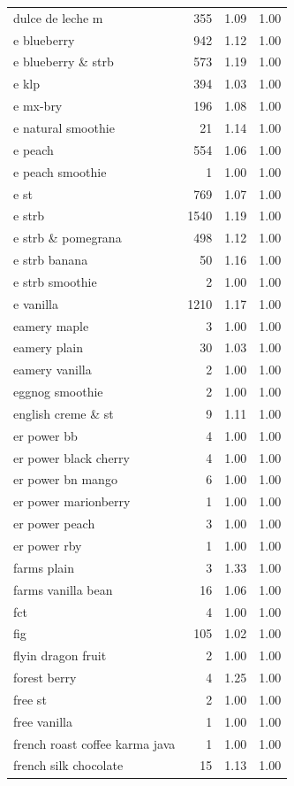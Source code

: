 \begin{table}
\begin{tabular}{lrrr}
dulce de leche m & 355 & 1.09 & 1.00 \\
e blueberry & 942 & 1.12 & 1.00 \\
e blueberry \& strb & 573 & 1.19 & 1.00 \\
e klp & 394 & 1.03 & 1.00 \\
e mx-bry & 196 & 1.08 & 1.00 \\
e natural smoothie & 21 & 1.14 & 1.00 \\
e peach & 554 & 1.06 & 1.00 \\
e peach smoothie & 1 & 1.00 & 1.00 \\
e st & 769 & 1.07 & 1.00 \\
e strb & 1540 & 1.19 & 1.00 \\
e strb \& pomegrana & 498 & 1.12 & 1.00 \\
e strb banana & 50 & 1.16 & 1.00 \\
e strb smoothie & 2 & 1.00 & 1.00 \\
e vanilla & 1210 & 1.17 & 1.00 \\
eamery maple & 3 & 1.00 & 1.00 \\
eamery plain & 30 & 1.03 & 1.00 \\
eamery vanilla & 2 & 1.00 & 1.00 \\
eggnog smoothie & 2 & 1.00 & 1.00 \\
english creme \& st & 9 & 1.11 & 1.00 \\
er power bb & 4 & 1.00 & 1.00 \\
er power black cherry & 4 & 1.00 & 1.00 \\
er power bn mango & 6 & 1.00 & 1.00 \\
er power marionberry & 1 & 1.00 & 1.00 \\
er power peach & 3 & 1.00 & 1.00 \\
er power rby & 1 & 1.00 & 1.00 \\
farms plain & 3 & 1.33 & 1.00 \\
farms vanilla bean & 16 & 1.06 & 1.00 \\
fct & 4 & 1.00 & 1.00 \\
fig & 105 & 1.02 & 1.00 \\
flyin dragon fruit & 2 & 1.00 & 1.00 \\
forest berry & 4 & 1.25 & 1.00 \\
free st & 2 & 1.00 & 1.00 \\
free vanilla & 1 & 1.00 & 1.00 \\
french roast coffee karma java & 1 & 1.00 & 1.00 \\
french silk chocolate & 15 & 1.13 & 1.00 \\

\end{tabular}
\end{table}
